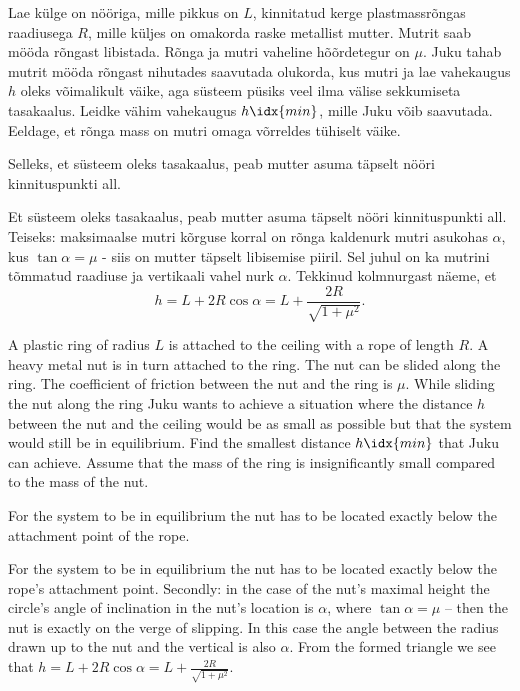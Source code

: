
Lae külge on nööriga, mille pikkus on $L$, kinnitatud kerge plastmassrõngas raadiusega $R$, mille küljes on omakorda raske metallist mutter. Mutrit saab mööda rõngast libistada. Rõnga ja mutri vaheline hõõrdetegur on $\mu$. Juku tahab mutrit mööda rõngast nihutades saavutada olukorda, kus mutri ja lae vahekaugus $h$ oleks võimalikult väike, aga süsteem püsiks veel ilma välise sekkumiseta tasakaalus. Leidke vähim vahekaugus $h\idx{min}$, mille Juku võib saavutada. Eeldage, et rõnga mass on mutri omaga võrreldes tühiselt väike.

\hint
Selleks, et süsteem oleks tasakaalus, peab mutter asuma täpselt nööri kinnituspunkti all.

\solu
Et süsteem oleks tasakaalus, peab mutter asuma täpselt nööri kinnituspunkti all. Teiseks: maksimaalse mutri kõrguse korral on rõnga kaldenurk mutri asukohas $\alpha$, kus $\tan \alpha = \mu$ - siis on mutter täpselt libisemise piiril. Sel juhul on ka mutrini tõmmatud raadiuse ja vertikaali vahel nurk $\alpha$. Tekkinud kolmnurgast näeme, et
\[
h=L+2R\cos \alpha = L+ \frac{2R}{\sqrt{1+\mu^2}}.
\]

A plastic ring of radius $L$ is attached to the ceiling with a rope of length $R$. A heavy metal nut is in turn attached to the ring. The nut can be slided along the ring. The coefficient of friction between the nut and the ring is $\mu$. While sliding the nut along the ring Juku wants to achieve a situation where the distance $h$ between the nut and the ceiling would be as small as possible but that the system would still be in equilibrium. Find the smallest distance $h\idx{min}$ that Juku can achieve. Assume that the mass of the ring is insignificantly small compared to the mass of the nut.

\hinteng
For the system to be in equilibrium the nut has to be located exactly below the attachment point of the rope.

\solueng
For the system to be in equilibrium the nut has to be located exactly below the rope’s attachment point. Secondly: in the case of the nut’s maximal height the circle’s angle of inclination in the nut’s location is $\alpha$, where $\tan \alpha = \mu$ – then the nut is exactly on the verge of slipping. In this case the angle between the radius drawn up to the nut and the vertical is also $\alpha$. From the formed triangle we see that $h=L+2R\cos \alpha = L+ \frac{2R}{\sqrt{1+\mu^2}}$.
\probend
